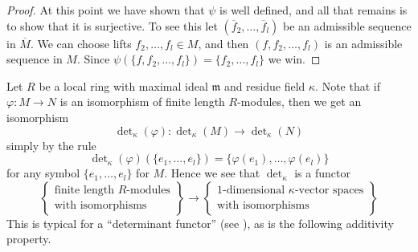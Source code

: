 \begin{proof}
\medskip\noindent
At this point we have shown that $\psi$ is well defined, and all that remains
is to show that it is surjective. To see this let
$(\overline{f}_2, \ldots, \overline{f}_l)$ be an admissible sequence
in $\overline{M}$. We can choose lifts $f_2, \ldots, f_l \in M$, and
then $(f, f_2, \ldots, f_l)$ is an admissible sequence in $M$.
Since $\psi(\{f, f_2, \ldots, f_l\}) = \{f_2, \ldots, f_l\}$ we win.
\end{proof}

\noindent
Let $R$ be a local ring with maximal ideal $\mathfrak m$ and
residue field $\kappa$. Note that if $\varphi : M \to N$ is an
isomorphism of finite length $R$-modules, then we get an
isomorphism
$$
\det\nolimits_\kappa(\varphi) :
\det\nolimits_\kappa(M)
\to
\det\nolimits_\kappa(N)
$$
simply by the rule
$$
\det\nolimits_\kappa(\varphi)(\{e_1, \ldots, e_l\})
=
\{\varphi(e_1), \ldots, \varphi(e_l)\}
$$
for any symbol $\{e_1, \ldots, e_l\}$ for $M$.
Hence we see that $\det\nolimits_\kappa$ is a functor
\begin{equation}
\left\{
\begin{matrix}
\text{finite length $R$-modules}\\
\text{with isomorphisms}
\end{matrix}
\right\}
\longrightarrow
\left\{
\begin{matrix}
1\text{-dimensional }\kappa\text{-vector spaces}\\
\text{with isomorphisms}
\end{matrix}
\right\}
\end{equation}
This is typical for a ``determinant functor''
(see \cite{Knudsen}), as is the following additivity
property.

